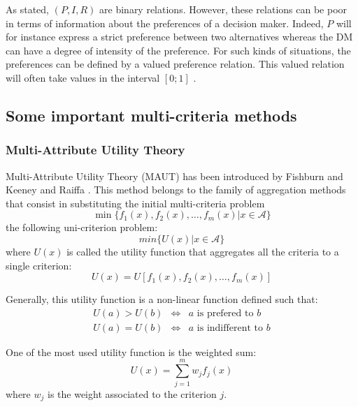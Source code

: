 As stated, $(P,I,R)$ are binary relations. However, these relations can be poor in terms of information about the preferences of a decision maker. Indeed, $P$ will for instance express a strict preference between two alternatives whereas the DM can have a degree of intensity of the preference. For such kinds of situations, the preferences can be defined by a valued preference relation. This valued relation will often take values in the interval $[0; 1]$ \cite{EhrgottFigueiraGreco2005}.

\subsection{Some important multi-criteria methods}
\label{subsec:mcdamethods}

\subsubsection{Multi-Attribute Utility Theory}
Multi-Attribute Utility Theory (MAUT) has been introduced by Fishburn \cite{Fishburn70} and Keeney and Raiffa \cite{KeeneyRaiffa76}. This method belongs to the family of aggregation methods that consist in substituting the initial multi-criteria problem
\begin{equation}
\min \{f_1(x), f_2(x), \dots, f_m(x) | x \in \mathcal{A}\}
\end{equation}
the following uni-criterion problem:
\begin{equation}
min \{U(x) | x \in \mathcal{A}\}
\end{equation}
where $U(x)$ is called the utility function that aggregates all the criteria to a single criterion:
\begin{equation}
U(x) = U[f_1(x), f_2(x), \dots, f_m(x)]
\end{equation}

Generally, this utility function is a non-linear function defined such that:
\begin{eqnarray}
U(a) > U(b) &\Leftrightarrow& a \text{ is prefered to } b\\
U(a) = U(b) &\Leftrightarrow& a \text{ is indifferent to } b
\end{eqnarray}

One of the most used utility function is the weighted sum:
\begin{equation}
U(x) = \sum_{j=1}^{m} w_j f_j(x)
\end{equation}
where $w_j$ is the weight associated to the criterion $j$.

